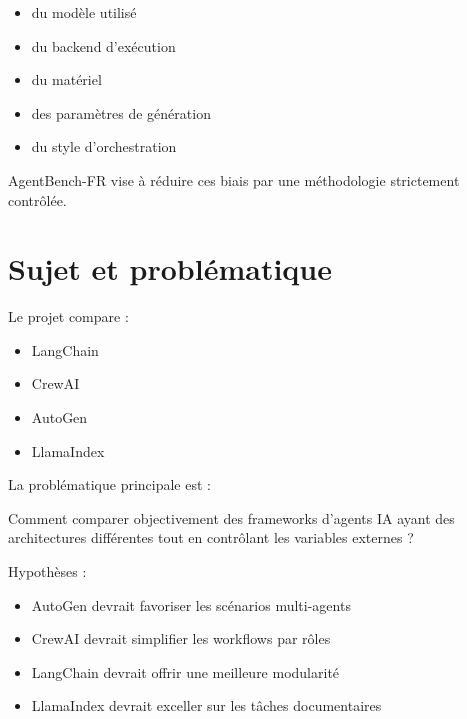 \documentclass[12pt,a4paper]{article}
\begin{document}
\begin{itemize}

\item du modèle utilisé

\item du backend d'exécution

\item du matériel

\item des paramètres de génération

\item du style d'orchestration

\end{itemize}

AgentBench-FR vise à réduire ces biais
par une méthodologie strictement contrôlée.


\section{Sujet et problématique}

Le projet compare :

\begin{itemize}

\item LangChain

\item CrewAI

\item AutoGen

\item LlamaIndex

\end{itemize}

La problématique principale est :

\begin{keypoint}

Comment comparer objectivement
des frameworks d'agents IA
ayant des architectures différentes
tout en contrôlant
les variables externes ?

\end{keypoint}

Hypothèses :

\begin{itemize}

\item AutoGen devrait favoriser les scénarios multi-agents

\item CrewAI devrait simplifier les workflows par rôles

\item LangChain devrait offrir une meilleure modularité

\item LlamaIndex devrait exceller sur les tâches documentaires

\end{itemize}
\end{document}
